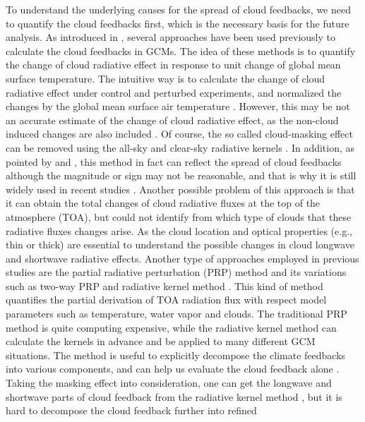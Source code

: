 

To understand the underlying causes for the spread of cloud feedbacks, we need to quantify the cloud feedbacks first, which is the necessary basis for the future analysis. As introduced in , several approaches have been used previously to calculate the cloud feedbacks in GCMs. The idea of these methods is to quantify the change of cloud radiative effect in response to unit change of global mean surface temperature. The intuitive way is to calculate the change of cloud radiative effect under control and perturbed experiments, and normalized the changes by the global mean surface air temperature \citep[e.g.,][]{Cess1990intercomparison,Cess1996cloud}. However, this may be not an accurate estimate of the change of cloud radiative effect, as  the non-cloud induced changes are also included \cite[e.g.,][]{Soden2004}. Of course, the so called cloud-masking effect can be removed using the all-sky and clear-sky radiative kernels \citep[Details in ;][]{Shell2008}. In addition, as pointed by \cite{Soden2008} and \cite{Vial2013}, this method in fact can reflect the spread of cloud feedbacks although the magnitude or sign may not be reasonable, and that is why it is still widely used in recent studies \citep[e.g.,][]{Webb2015}. Another possible problem of this approach is that it can obtain the total changes of cloud radiative fluxes at the top of the atmosphere (TOA), but could not identify from which type of clouds that these radiative fluxes changes arise. As the cloud location and optical properties (e.g., thin or thick) are essential to understand the possible changes in cloud longwave and shortwave radiative effects. Another type of approaches employed in previous studies are the partial radiative perturbation (PRP) method \citep{Wetherald1988cloud} and its variations such as two-way PRP \citep[e.g.,][]{Colman1997} and radiative kernel method \citep[e.g.,][]{Soden2008,Shell2008,Huang2017,Pendergrass2018,Smith2020}. This kind of method quantifies the partial derivation of TOA radiation flux with respect model parameters such as temperature, water vapor and clouds. The traditional PRP method is quite computing expensive, while the radiative kernel method can calculate the kernels in advance and be applied to many different GCM situations. The method is useful to explicitly decompose the climate feedbacks into various components, and can help us evaluate the cloud feedback alone \citep[e.g.,][]{Soden2004,Soden2006,Soden2008}. Taking the masking effect into consideration, one can get the longwave and shortwave parts of cloud feedback from the radiative kernel method \citep[e.g.,][]{Soden2008,Caldwell2016quantifying}, but it is hard to decompose the cloud feedback further into refined 